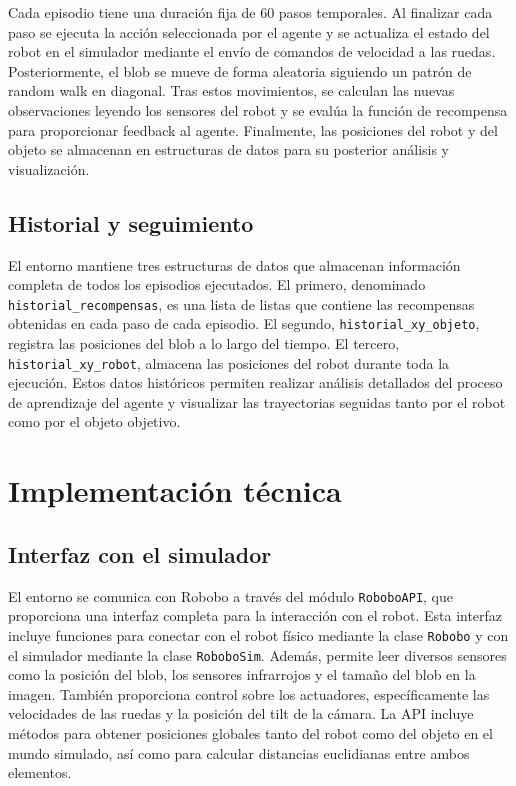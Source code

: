 \documentclass[12pt,a4paper]{article}
\begin{document}
Cada episodio tiene una duración fija de 60 pasos temporales. Al finalizar cada
paso se ejecuta la acción seleccionada por el agente y se actualiza el estado
del robot en el simulador mediante el envío de comandos de velocidad a las
ruedas. Posteriormente, el blob se mueve de forma aleatoria siguiendo un patrón
de random walk en diagonal. Tras estos
movimientos, se calculan las nuevas observaciones leyendo los sensores del robot
y se evalúa la función de recompensa para proporcionar feedback al agente.
Finalmente, las posiciones del robot y del objeto se almacenan en estructuras de
datos para su posterior análisis y visualización.

\subsection{Historial y seguimiento}

El entorno mantiene tres estructuras de datos que almacenan información completa
de todos los episodios ejecutados. El primero, denominado
\texttt{historial\_recompensas}, es una lista de listas que contiene las
recompensas obtenidas en cada paso de cada episodio. El segundo,
\texttt{historial\_xy\_objeto}, registra las posiciones del blob a lo largo del
tiempo. El tercero, \texttt{historial\_xy\_robot}, almacena las posiciones del
robot durante toda la ejecución. Estos datos históricos permiten realizar
análisis detallados del proceso de aprendizaje del agente y visualizar las
trayectorias seguidas tanto por el robot como por el objeto objetivo.

\section{Implementación técnica}

\subsection{Interfaz con el simulador}

El entorno se comunica con Robobo a través del módulo \texttt{RoboboAPI}, que
proporciona una interfaz completa para la interacción con el robot. Esta
interfaz incluye funciones para conectar con el robot físico mediante la clase
\texttt{Robobo} y con el simulador mediante la clase \texttt{RoboboSim}. Además,
permite leer diversos sensores como la posición del blob, los sensores
infrarrojos y el tamaño del blob en la imagen. También proporciona control sobre
los actuadores, específicamente las velocidades de las ruedas y la posición del
tilt de la cámara. La API incluye métodos para obtener posiciones
globales tanto del robot como del objeto en el mundo simulado, así como para
calcular distancias euclidianas entre ambos elementos.
\end{document}
